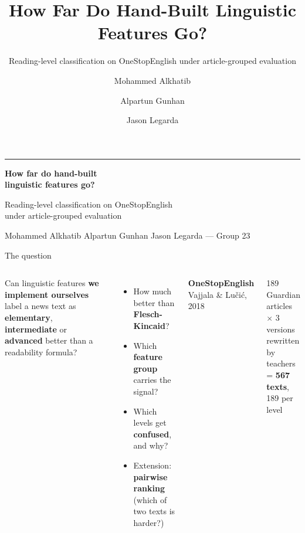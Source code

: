 \documentclass[aspectratio=169,11pt]{beamer}
\title{How Far Do Hand-Built Linguistic Features Go?}
\subtitle{Reading-level classification on OneStopEnglish under article-grouped evaluation}
\author{Mohammed Alkhatib \and Alpartun Gunhan \and Jason Legarda}
\institute{Group 23}
\date{}
\newcommand{\hl}[1]{{\color{accent}\bfseries #1}}
\newcommand{\subtle}[1]{{\color{muted}\small #1}}
\begin{document}
\begin{frame}[plain]
\vspace{2.5em}
{\color{accent}\rule{3em}{3pt}}\par\vspace{0.8em}
{\huge\bfseries How far do hand-built\\[0.2em] linguistic features go?\par}
\vspace{0.8em}
{\large Reading-level classification on OneStopEnglish\\under article-grouped evaluation\par}
\vspace{2em}
{\color{muted} Mohammed Alkhatib \quad Alpartun Gunhan \quad Jason Legarda \quad --- \quad Group 23}
\end{frame}

\begin{frame}{The question}
\begin{columns}[T]
Can linguistic features \textbf{we implement ourselves} label a news text as
\textbf{elementary}, \textbf{intermediate} or \textbf{advanced} better than a readability formula?
\vspace{1em}
\begin{itemize}
\item How much better than \textbf{Flesch-Kincaid}?
\item Which \textbf{feature group} carries the signal?
\item Which levels get \textbf{confused}, and why?
\item Extension: \textbf{pairwise ranking} (which of two texts is harder?)
\end{itemize}
\vspace{0.5em}
\textbf{OneStopEnglish}\\
\subtle{Vajjala \& Lučić, 2018}\par\vspace{0.6em}
189 Guardian articles\\
$\times$ 3 versions rewritten by teachers\\
= \hl{567 texts}, 189 per level
\end{columns}
\end{frame}
\end{document}
